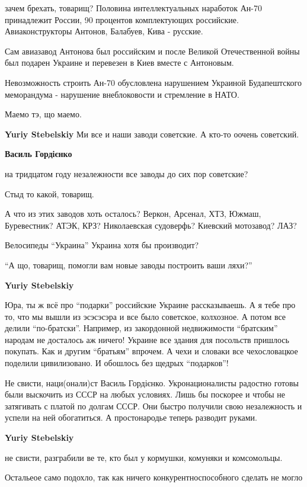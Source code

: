 \begin{itemize}
\begin{itemize}
\begin{itemize}
зачем брехать, товарищ? Половина интеллектуальных наработок Ан-70 принадлежит
России, 90 процентов комплектующих российские. Авиаконструкторы Антонов,
Балабуев, Кива - русские.

Сам авиазавод Антонова был российским и после Великой Отечественной войны был
подарен Украине и перевезен в Киев вместе с Антоновым.

Невозможность строить Ан-70 обусловлена нарушением Украиной Будапештского
меморандума - нарушение внеблоковости и стремление в НАТО.

Маемо тэ, що маемо.

\textbf{Yuriy Stebelskiy} Ми все и наши заводи советские. А кто-то оочень советский.

\textbf{Василь Гордієнко} 

на тридцатом году незалежности все заводы до сих пор советские?

Стыд то какой, товарищ.

А что из этих заводов хоть осталось? Веркон, Арсенал, ХТЗ, Южмаш, Буревестник?
АТЭК, КРЗ? Николаевская судоверфь? Киевский мотозавод? ЛАЗ?

Велосипеды \enquote{Украина} Украина хотя бы производит?

\enquote{А що, товарищ, помогли вам новые заводы построить ваши ляхи?}

\textbf{Yuriy Stebelskiy} 

Юра, ты ж всё про \enquote{подарки} российские Украине рассказываешь. А я тебе про то,
что мы вышли из эсэсэсэра и все было советское, колхозное. А потом все делили
\enquote{по-братски}. Например, из закордонной недвижимости \enquote{братским} народам не
досталось аж ничего! Украине все здания для посольств пришлось покупать. Как и
другим \enquote{братьям} впрочем. А чехи и словаки все чехословацкое поделили
цивилизовано. И обошлось без щедрых \enquote{подарков}!


Не свисти, наци(онали)ст Василь Гордієнко. Укронационалисты радостно готовы
были выскочить из СССР на любых условиях. Лишь бы поскорее и чтобы не
затягивать с платой по долгам СССР. Они быстро получили свою незалежность и
успели на ней обогатиться. А простонародье теперь разводит руками.

\textbf{Yuriy Stebelskiy} 

не свисти, разграбили ве те, кто был у кормушки, комуняки и комсомольцы.

Остальеое само подохло, так как ничего конкурентноспособного сделать не могло

\end{itemize} %

\end{itemize} %

\end{itemize} %

